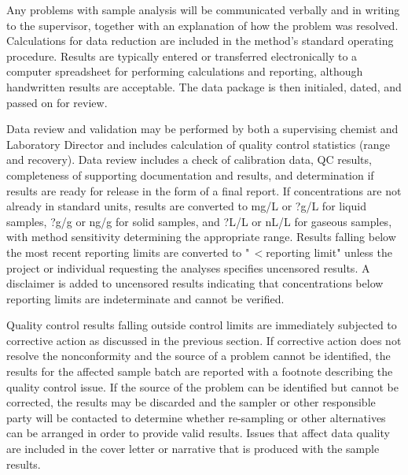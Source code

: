 Any problems with sample analysis will be communicated verbally and in 
writing to the supervisor, together with an explanation of how the 
problem was resolved. Calculations for data reduction are included in 
the method's standard operating procedure. Results are typically entered 
or transferred electronically to a computer spreadsheet for performing 
calculations and reporting, although handwritten results are acceptable. 
The data package is then initialed, dated, and passed on for review.

Data review and validation may be performed by both a supervising 
chemist and Laboratory Director and includes calculation of quality 
control statistics (range and recovery). Data review includes a check of 
calibration data, QC results, completeness of supporting documentation 
and results, and determination if results are ready for release in the 
form of a final report. If concentrations are not already in standard 
units, results are converted to mg/L or ?g/L for liquid samples, ?g/g or 
ng/g for solid samples, and ?L/L or nL/L for gaseous samples, with 
method sensitivity determining the appropriate range. Results falling 
below the most recent reporting limits are converted to "\,$<$reporting 
limit" unless the project or individual requesting the analyses 
specifies uncensored results. A disclaimer is added to uncensored 
results indicating that concentrations below reporting limits are 
indeterminate and cannot be verified. 

Quality control results falling outside control limits are immediately 
subjected to corrective action as discussed in the previous section. If 
corrective action does not resolve the nonconformity and the source of a 
problem cannot be identified, the results for the affected sample batch 
are reported with a footnote describing the quality control issue. If 
the source of the problem can be identified but cannot be corrected, the 
results may be discarded and the sampler or other responsible party will 
be contacted to determine whether re-sampling or other alternatives can 
be arranged in order to provide valid results. Issues that affect data 
quality are included in the cover letter or narrative that is produced 
with the sample results. 



